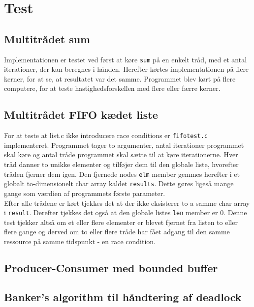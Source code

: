 \section{Test}

\subsection{Multitrådet sum}
Implementationen er testet ved først at køre \texttt{sum} på en enkelt tråd, med et antal iterationer, der kan beregnes i hånden.
Herefter kørtes implementationen på flere kerner, for at se, at resultatet var det samme. 
Programmet blev kørt på flere computere, for at teste hastighedsforskellen med flere eller færre kerner. 

\subsection{Multitrådet FIFO kædet liste}
For at teste at list.c ikke introducere race conditions er \texttt{fifotest.c} implementeret. Programmet tager to argumenter, antal iterationer programmet skal køre og antal tråde programmet skal sætte til at køre iterationerne. Hver tråd danner to unikke elementer og tilføjer dem til den globale liste, hvorefter tråden fjerner dem igen. Den fjernede nodes \texttt{elm} member gemmes herefter i et globalt to-dimensionelt char array kaldet \texttt{results}. Dette gøres ligeså mange gange som værdien af programmets første parameter. \\

Efter alle trådene er kørt tjekkes det at der ikke eksisterer to a samme char array i \texttt{result}. Derefter tjekkes det også at den globale listes \texttt{len} member er 0. Denne test tjekker altså om et eller flere elementer er blevet fjernet fra listen to eller flere gange og derved om to eller flere tråde har fået adgang til den samme ressource på samme tidspunkt - en race condition.

\subsection{Producer-Consumer med bounded buffer}

\subsection{Banker's algorithm til håndtering af deadlock}

